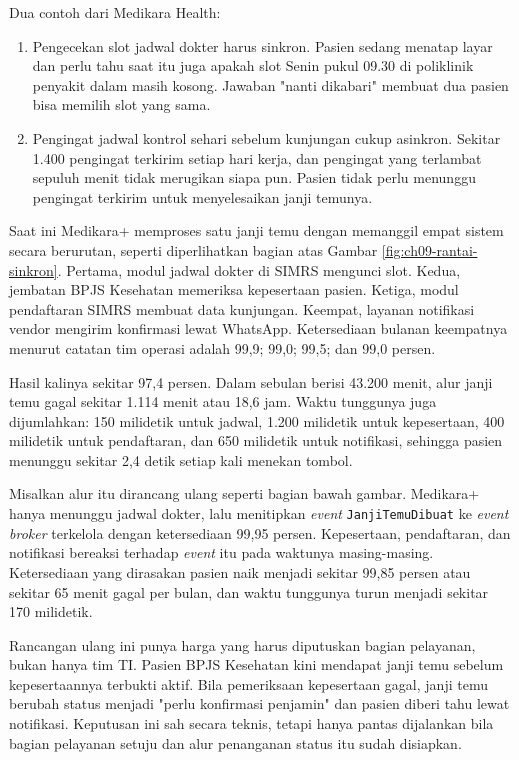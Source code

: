 Dua contoh dari Medikara Health:
\begin{enumerate}
  \item Pengecekan slot jadwal dokter harus sinkron. Pasien sedang menatap layar dan perlu tahu saat
        itu juga apakah slot Senin pukul 09.30 di poliklinik penyakit dalam masih kosong. Jawaban
        "nanti dikabari" membuat dua pasien bisa memilih slot yang sama.
  \item Pengingat jadwal kontrol sehari sebelum kunjungan cukup asinkron. Sekitar 1.400 pengingat
        terkirim setiap hari kerja, dan pengingat yang terlambat sepuluh menit tidak merugikan
        siapa pun. Pasien tidak perlu menunggu pengingat terkirim untuk menyelesaikan janji
        temunya.
\end{enumerate}

\begin{kasus}[title={Kasus Medikara Health: Alur Janji Temu yang Memanggil Empat Sistem}]
  Saat ini Medikara+ memproses satu janji temu dengan memanggil empat sistem secara berurutan,
  seperti diperlihatkan bagian atas Gambar \ref{fig:ch09-rantai-sinkron}. Pertama, modul jadwal
  dokter di SIMRS mengunci slot. Kedua, jembatan BPJS Kesehatan memeriksa kepesertaan pasien.
  Ketiga, modul pendaftaran SIMRS membuat data kunjungan. Keempat, layanan notifikasi vendor
  mengirim konfirmasi lewat WhatsApp. Ketersediaan bulanan keempatnya menurut catatan tim
  operasi adalah 99,9; 99,0; 99,5; dan 99,0 persen.

  Hasil kalinya sekitar 97,4 persen. Dalam sebulan berisi 43.200 menit, alur janji temu gagal
  sekitar 1.114 menit atau 18,6 jam. Waktu tunggunya juga dijumlahkan: 150 milidetik untuk jadwal,
  1.200 milidetik untuk kepesertaan, 400 milidetik untuk pendaftaran, dan 650 milidetik untuk
  notifikasi, sehingga pasien menunggu sekitar 2,4 detik setiap kali menekan tombol.

  Misalkan alur itu dirancang ulang seperti bagian bawah gambar. Medikara+ hanya menunggu jadwal
  dokter, lalu menitipkan \textit{event} \texttt{JanjiTemuDibuat} ke \textit{event broker}
  terkelola dengan ketersediaan 99,95 persen. Kepesertaan, pendaftaran, dan notifikasi bereaksi
  terhadap \textit{event} itu pada waktunya masing-masing. Ketersediaan yang dirasakan pasien naik
  menjadi sekitar 99,85 persen atau sekitar 65 menit gagal per bulan, dan waktu tunggunya turun
  menjadi sekitar 170 milidetik.

  Rancangan ulang ini punya harga yang harus diputuskan bagian pelayanan, bukan hanya tim TI.
  Pasien BPJS Kesehatan kini mendapat janji temu sebelum kepesertaannya terbukti aktif. Bila
  pemeriksaan kepesertaan gagal, janji temu berubah status menjadi "perlu konfirmasi penjamin" dan
  pasien diberi tahu lewat notifikasi. Keputusan ini sah secara teknis, tetapi hanya pantas
  dijalankan bila bagian pelayanan setuju dan alur penanganan status itu sudah disiapkan.
\end{kasus}

